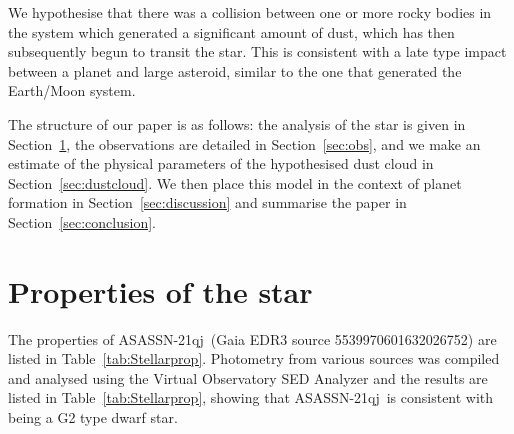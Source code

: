 \documentclass{aa}
\newcommand{\asas}{ASASSN-21qj}
\begin{document}
We hypothesise that there was a collision between one or more rocky bodies in the system which generated a significant amount of dust, which has then subsequently begun to transit the star.
%
This is consistent with a late type impact between a planet and large asteroid, similar to the one that generated the Earth/Moon system.

The structure of our paper is as follows: the analysis of the star is given in Section~\ref{sec:star}, the observations are detailed in Section~\ref{sec:obs}, and we make an estimate of the physical parameters of the hypothesised dust cloud in Section~\ref{sec:dustcloud}.
%
We then place this model in the context of planet formation in Section~\ref{sec:discussion} and summarise the paper in Section~\ref{sec:conclusion}.




\section{Properties of the star}\label{sec:star}

The properties of \asas\ (Gaia EDR3 source 5539970601632026752) are listed in Table~\ref{tab:Stellarprop}.
%
Photometry from various sources was compiled and analysed using the Virtual Observatory SED Analyzer \citep[VOSA; ][]{Bayo08} and the results are listed in Table~\ref{tab:Stellarprop}, showing that \asas\ is consistent with being a G2 type dwarf star.
\end{document}
